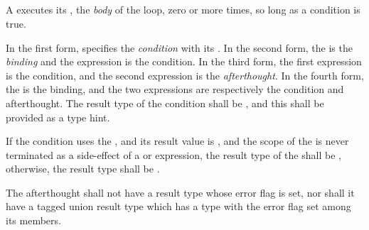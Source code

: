 
\begin{grammar}
 \\
	  \terminal{(}  \terminal{)}  \\

 \\
	 \\
	 \terminal{;}  \\
	 \terminal{;}  \\
	 \terminal{;}  \terminal{;}  \\

 \\
	\terminal{:}  \\
\end{grammar}

\specsubsubitem
A  executes its , the
\textit{body} of the loop, zero or more times, so long as a condition is true.

\specsubsubitem
In the first form,  specifies the \textit{condition}
with its . In the second form, the
 is the \textit{binding} and the expression is the
condition. In the third form, the first expression is the condition, and the
second expression is the \textit{afterthought}. In the fourth form, the
 is the binding, and the two expressions are
respectively the condition and afterthought. The result type of the condition
shall be , and this shall be provided as a type hint.

\specsubsubitem
If the condition uses the , and
its result value is , and the scope of the 
is never terminated as a side-effect of a  or 
expression, the result type of the  shall be
, otherwise, the result type shall be .

\specsubsubitem
The afterthought shall not have a result type whose error flag is set, nor shall
it have a tagged union result type which has a type with the error flag set
among its members.

